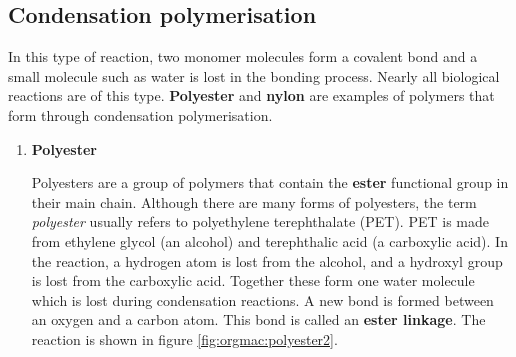 \subsection{Condensation polymerisation}

In this type of reaction, two monomer molecules form a covalent bond and a small molecule such as water is lost in the bonding process. Nearly all biological reactions are of this type. \textbf{Polyester} and \textbf{nylon} are examples of polymers that form through condensation polymerisation.

\begin{enumerate}
\item{\textbf{Polyester}

Polyesters are a group of polymers that contain the \textbf{ester} functional group in their main chain. Although there are many forms of polyesters, the term \textit{polyester} usually refers to polyethylene terephthalate (PET). PET is made from ethylene glycol (an alcohol) and terephthalic acid (a carboxylic acid). In the reaction, a hydrogen atom is lost from the alcohol, and a hydroxyl group is lost from the carboxylic acid. Together these form one water molecule which is lost during condensation reactions. A new bond is formed between an oxygen and a carbon atom. This bond is called an \textbf{ester linkage}. The reaction is shown in figure \ref{fig:orgmac:polyester2}. 

}
\end{enumerate}
